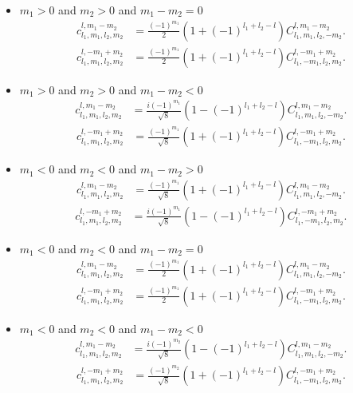 \documentclass[onecolumn,11pt]{IEEEtran}
\begin{document}
\begin{itemize}
    \item $m_1 > 0$ and $m_2 > 0$ and $m_1-m_2 = 0$
        \begin{align*}
            c^{l,m_1-m_2}_{l_1,m_1,l_2,m_2} & = \frac{(-1)^{m_1}}{2} ( 1 + (-1)^{l_1+l_2-l}) C^{l,m_1-m_2}_{l_1,m_1,l_2,-m_2}.
        \end{align*}
        \begin{align*}
            c^{l,-m_1+m_2}_{l_1,m_1,l_2,m_2} & = \frac{(-1)^{m_1}}{2} ( 1 + (-1)^{l_1+l_2-l}) C^{l,-m_1+m_2}_{l_1,-m_1,l_2,m_2}.
        \end{align*}

    \item $m_1 > 0$ and $m_2 > 0$ and $m_1-m_2 < 0$
        \begin{align*}
            c^{l,m_1-m_2}_{l_1,m_1,l_2,m_2} & = \frac{i(-1)^{m_1}}{\sqrt{8}} ( 1 - (-1)^{l_1+l_2-l}) C^{l,m_1-m_2}_{l_1,m_1,l_2,-m_2}.
        \end{align*}
        \begin{align*}
            c^{l,-m_1+m_2}_{l_1,m_1,l_2,m_2} & = \frac{(-1)^{m_1}}{\sqrt{8}} ( 1 + (-1)^{l_1+l_2-l}) C^{l,-m_1+m_2}_{l_1,-m_1,l_2,m_2}.
        \end{align*}

    \item $m_1 < 0$ and $m_2 < 0$ and $m_1-m_2 >0$
        \begin{align*}
            c^{l,m_1-m_2}_{l_1,m_1,l_2,m_2} & = \frac{(-1)^{m_1}}{\sqrt{8}} ( 1 + (-1)^{l_1+l_2-l}) C^{l,m_1-m_2}_{l_1,m_1,l_2,-m_2}.
        \end{align*}
        \begin{align*}
            c^{l,-m_1+m_2}_{l_1,m_1,l_2,m_2} & = \frac{i(-1)^{m_1}}{\sqrt{8}} ( 1 - (-1)^{l_1+l_2-l}) C^{l,-m_1+m_2}_{l_1,-m_1,l_2,m_2}.
        \end{align*}

    \item $m_1 < 0$ and $m_2 < 0$ and $m_1-m_2 = 0$
        \begin{align*}
            c^{l,m_1-m_2}_{l_1,m_1,l_2,m_2} & = \frac{(-1)^{m_1}}{2} ( 1 + (-1)^{l_1+l_2-l}) C^{l,m_1-m_2}_{l_1,m_1,l_2,-m_2}.
        \end{align*}
        \begin{align*}
            c^{l,-m_1+m_2}_{l_1,m_1,l_2,m_2} & = \frac{(-1)^{m_1}}{2} ( 1 + (-1)^{l_1+l_2-l}) C^{l,-m_1+m_2}_{l_1,-m_1,l_2,m_2}.
        \end{align*}

    \item $m_1 < 0$ and $m_2 < 0$ and $m_1-m_2 < 0$
        \begin{align*}
            c^{l,m_1-m_2}_{l_1,m_1,l_2,m_2} & = \frac{i(-1)^{m_2}}{\sqrt{8}} ( 1 - (-1)^{l_1+l_2-l}) C^{l,m_1-m_2}_{l_1,m_1,l_2,-m_2}.
        \end{align*}
        \begin{align*}
            c^{l,-m_1+m_2}_{l_1,m_1,l_2,m_2} & = \frac{(-1)^{m_2}}{\sqrt{8}} ( 1 + (-1)^{l_1+l_2-l}) C^{l,-m_1+m_2}_{l_1,-m_1,l_2,m_2}.
        \end{align*}


\end{itemize}
\end{document}
